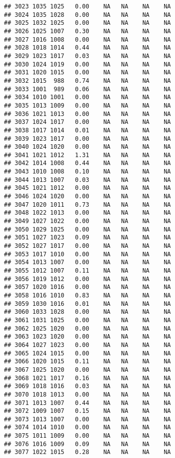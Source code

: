 \documentclass{article}\usepackage{graphicx, color}
\makeatletter
\newenvironment{kframe}{%
 \def\at@end@of@kframe{}%
 \ifinner\ifhmode%
  \def\at@end@of@kframe{\end{minipage}}%
  \begin{minipage}{\columnwidth}%
 \fi\fi%
 \def\FrameCommand##1{\hskip\@totalleftmargin \hskip-\fboxsep
 \colorbox{shadecolor}{##1}\hskip-\fboxsep
     \hskip-\linewidth \hskip-\@totalleftmargin \hskip\columnwidth}%
 \MakeFramed {\advance\hsize-\width
   \@totalleftmargin\z@ \linewidth\hsize
   \@setminipage}}%
 {\par\unskip\endMakeFramed%
 \at@end@of@kframe}
\newenvironment{knitrout}{}{} %
\makeatother
\begin{document}
\begin{knitrout}
\begin{kframe}
\begin{verbatim}
## 3023 1035 1025   0.00    NA   NA    NA    NA
## 3024 1035 1028   0.00    NA   NA    NA    NA
## 3025 1032 1025   0.00    NA   NA    NA    NA
## 3026 1025 1007   0.30    NA   NA    NA    NA
## 3027 1016 1008   0.00    NA   NA    NA    NA
## 3028 1018 1014   0.44    NA   NA    NA    NA
## 3029 1023 1017   0.03    NA   NA    NA    NA
## 3030 1024 1019   0.00    NA   NA    NA    NA
## 3031 1020 1015   0.00    NA   NA    NA    NA
## 3032 1015  988   0.74    NA   NA    NA    NA
## 3033 1001  989   0.06    NA   NA    NA    NA
## 3034 1010 1001   0.00    NA   NA    NA    NA
## 3035 1013 1009   0.00    NA   NA    NA    NA
## 3036 1021 1013   0.00    NA   NA    NA    NA
## 3037 1024 1017   0.00    NA   NA    NA    NA
## 3038 1017 1014   0.01    NA   NA    NA    NA
## 3039 1023 1017   0.00    NA   NA    NA    NA
## 3040 1024 1020   0.00    NA   NA    NA    NA
## 3041 1021 1012   1.31    NA   NA    NA    NA
## 3042 1014 1008   0.44    NA   NA    NA    NA
## 3043 1010 1008   0.10    NA   NA    NA    NA
## 3044 1013 1007   0.03    NA   NA    NA    NA
## 3045 1021 1012   0.00    NA   NA    NA    NA
## 3046 1024 1020   0.00    NA   NA    NA    NA
## 3047 1020 1011   0.73    NA   NA    NA    NA
## 3048 1022 1013   0.00    NA   NA    NA    NA
## 3049 1027 1022   0.00    NA   NA    NA    NA
## 3050 1029 1025   0.00    NA   NA    NA    NA
## 3051 1027 1023   0.09    NA   NA    NA    NA
## 3052 1027 1017   0.00    NA   NA    NA    NA
## 3053 1017 1010   0.00    NA   NA    NA    NA
## 3054 1013 1007   0.00    NA   NA    NA    NA
## 3055 1012 1007   0.11    NA   NA    NA    NA
## 3056 1019 1012   0.00    NA   NA    NA    NA
## 3057 1020 1016   0.00    NA   NA    NA    NA
## 3058 1016 1010   0.83    NA   NA    NA    NA
## 3059 1030 1016   0.01    NA   NA    NA    NA
## 3060 1033 1028   0.00    NA   NA    NA    NA
## 3061 1031 1025   0.00    NA   NA    NA    NA
## 3062 1025 1020   0.00    NA   NA    NA    NA
## 3063 1023 1020   0.00    NA   NA    NA    NA
## 3064 1027 1023   0.00    NA   NA    NA    NA
## 3065 1024 1015   0.00    NA   NA    NA    NA
## 3066 1020 1015   0.11    NA   NA    NA    NA
## 3067 1025 1020   0.00    NA   NA    NA    NA
## 3068 1021 1017   0.16    NA   NA    NA    NA
## 3069 1018 1016   0.03    NA   NA    NA    NA
## 3070 1018 1013   0.00    NA   NA    NA    NA
## 3071 1013 1007   0.44    NA   NA    NA    NA
## 3072 1009 1007   0.15    NA   NA    NA    NA
## 3073 1013 1007   0.00    NA   NA    NA    NA
## 3074 1014 1010   0.00    NA   NA    NA    NA
## 3075 1011 1009   0.00    NA   NA    NA    NA
## 3076 1016 1009   0.09    NA   NA    NA    NA
## 3077 1022 1015   0.28    NA   NA    NA    NA

\end{verbatim}
\end{kframe}
\end{knitrout}
\end{document}
